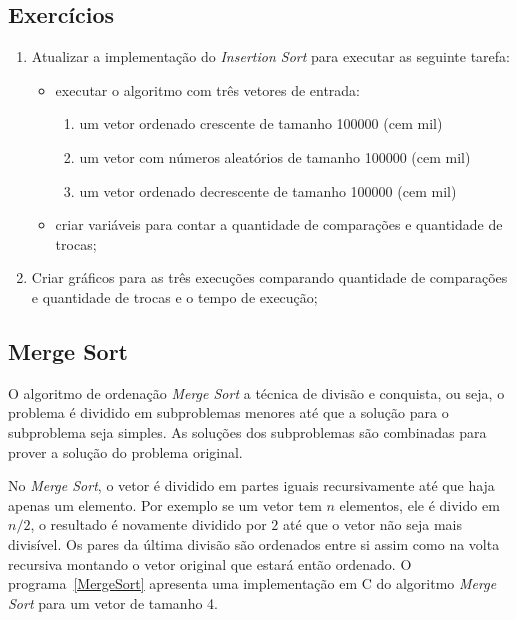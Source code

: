 \documentclass[11pt,fleqn]{book} %
\begin{document}
\subsection*{Exercícios}
\begin{enumerate}
	\item Atualizar a implementação do \textit{Insertion Sort} para executar as seguinte tarefa:
	\begin{itemize}
		\item executar o algoritmo com três vetores de entrada:
		\begin{enumerate}
			\item um vetor ordenado crescente de tamanho 100000 (cem mil)
			\item um vetor com números aleatórios de tamanho 100000 (cem mil)
			\item um vetor ordenado decrescente de tamanho 100000 (cem mil)
		\end{enumerate} 
		\item criar variáveis para contar a quantidade de comparações e quantidade de trocas;
	\end{itemize} 
	\item Criar gráficos para as três execuções comparando quantidade de comparações e quantidade de trocas e o tempo de execução;
\end{enumerate} 
\newpage
\subsection*{Merge Sort}
O algoritmo de ordenação \textit{Merge Sort} a técnica de divisão e conquista, ou seja, o problema é dividido em subproblemas menores até que a solução para o subproblema seja simples.
As soluções dos subproblemas são combinadas para prover a solução do problema original.

No \textit{Merge Sort}, o vetor é dividido em partes iguais recursivamente até que haja apenas um elemento. Por exemplo se um vetor tem $n$ elementos, ele é divido em $n/2$, o resultado é novamente dividido por $2$ até que o vetor não seja mais divisível.
Os pares da última divisão são ordenados entre si assim como na volta recursiva montando o vetor original que estará então ordenado.
O programa~\ref{MergeSort} apresenta uma implementação em C do algoritmo \textit{Merge Sort} para um vetor de tamanho 4.
\label{MergeSort}
\end{document}
